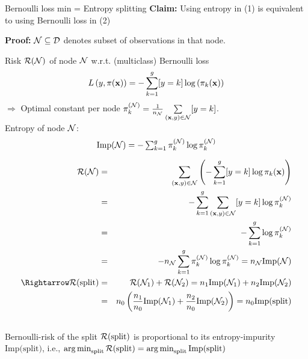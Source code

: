 \documentclass[11pt,compress,t,notes=noshow, xcolor=table]{beamer}
\begin{document}
\begin{vbframe}{Bernoulli loss min = Entropy splitting}
\textbf{Claim:} Using entropy in (1) 
    is equivalent to using Bernoulli loss in (2) %

\textbf{Proof:} %
$\mathcal{N} \subseteq \mathcal{D}$ denotes subset of observations in that node. 

Risk $\mathcal{R}(\mathcal{N})$ of node $\mathcal{N}$ w.r.t. (multiclass) Bernoulli loss  
$$
  L\left(y, \pi(\mathbf{x})\right) = -\sum_{k = 1}^g [y = k] \log \left(\pi_k(\mathbf{x})\right)
$$
$\Rightarrow$ Optimal constant per node $\pi_k^{(\mathcal{N})} = \frac{1}{n_{\mathcal{N}}} \sum\limits_{(\mathbf{x},y) \in \mathcal{N}} [y = k]$.\\

Entropy of node $\mathcal{N}$:
$$
\text{Imp}(\Np) = -\textstyle\sum_{k = 1}^g \pikN \log \pikN %
$$






\framebreak 
\begin{footnotesize}
\begin{eqnarray*}
\risk(\Np) &=& \sum_{\xy \in \Np} \left(- \sum_{k = 1}^g [y = k] \log \pi_k(\xv) \right) \\
&=& -\sum_{k = 1}^g \sum_{\xy \in \Np} [y = k]\log \pikN \\
&=& -\sum_{k = 1}^g \log \pikN %
\\
 &=& -n_{\Np} \sum_{k = 1}^g \pikN \log \pikN = n_\Np \text{Imp}(\Np)\\
 \Rightarrow \risk(\text{split}) &=& \risk(\Np_1) + \risk(\Np_2)  = n_1 \text{Imp}(\Np_1) + n_2 \text{Imp}(\Np_2)\\
 &=&n_0 \left(\frac{n_1}{n_0} \text{Imp}(\Np_1) + \frac{n_2}{n_0} \text{Imp}(\Np_2)\right) = n_0\text{Imp(split)}\\
\
\end{eqnarray*} 
Bernoulli-risk of the split $\mathcal{R}(\text{split})$ is proportional to its entropy-impurity $\text{Imp(split)}$, i.e., $\mathop{\mathrm{arg\,min}}_\text{split} \mathcal{R}(\text{split}) = \mathop{\mathrm{arg\,min}}_\text{split} \text{Imp(split)}$ \\

\end{footnotesize}


\end{vbframe}
\end{document}
